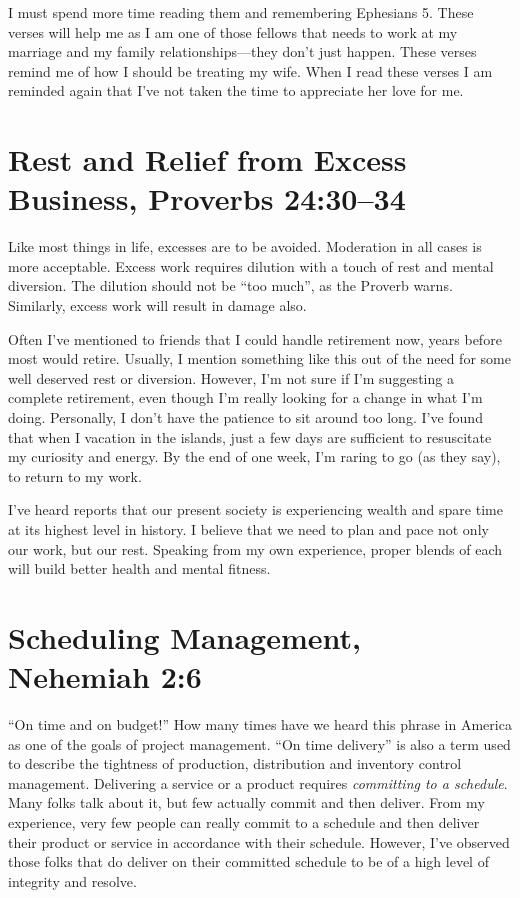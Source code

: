 \documentclass[12pt]{memoir}
\begin{document}
I must spend more time reading them and remembering Ephesians 5.
These verses will help me as I am one of those fellows that needs
to work at my marriage and my family relationships---they don't just
happen. These verses remind me of how I should be treating my wife. When I read these verses I am reminded again that I've not
taken the time to appreciate her love for me.

\section[Rest and Relief from Excess Business]{Rest and Relief from Excess Business, Proverbs 24:30--34}

Like most things in life, excesses are to be avoided. Moderation in
all cases is more acceptable. Excess work requires dilution with a
touch of rest and mental diversion. The dilution should not be ``too
much'', as the Proverb warns. Similarly, excess work will result
in damage also.

Often I've mentioned to friends that I could handle retirement now,
years before most would retire. Usually, I mention something like
this out of the need for some well deserved rest or diversion. However,
I'm not sure if I'm suggesting a complete retirement, even though I'm really
looking for a change in what I'm doing. Personally, I don't have the
patience to sit around too long. I've found that when I vacation in the islands, just a few days are sufficient to resuscitate my curiosity and energy. By the end of one week, I'm raring to go (as they say), to return to my work.

I've heard reports that our present society is experiencing wealth and spare time at its highest level in history. I believe that we need to plan and pace not only our work, but our rest. Speaking from my own experience, proper blends of each will build better health and mental fitness.

\section[Scheduling Management]{Scheduling Management, Nehemiah 2:6}

``On time and on budget!'' How many times have we heard this phrase in America as one of the goals of project management. ``On time delivery'' is also a term used to describe the tightness of production, distribution and inventory control management. Delivering a service or a product requires \emph{committing to a schedule}. Many folks talk about it, but few actually commit and then deliver. From my experience, very few people can really commit to a schedule and then deliver their product or service in accordance with their schedule. However, I've observed those folks that do deliver on their committed schedule to be of a high level of integrity and resolve.
\end{document}
